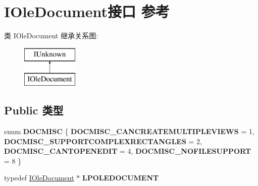 \hypertarget{interface_i_ole_document}{}\section{I\+Ole\+Document接口 参考}
\label{interface_i_ole_document}
类 I\+Ole\+Document 继承关系图\+:\begin{figure}[H]
\begin{center}
\leavevmode
\includegraphics[height=2.000000cm]{interface_i_ole_document}
\end{center}
\end{figure}
\subsection*{Public 类型}
\begin{DoxyCompactItemize}
\item 
\mbox{\label{interface_i_ole_document_af963ec76ceebdfe700a5f3efd6d51e92}} 
enum {\bfseries D\+O\+C\+M\+I\+SC} \{ {\bfseries D\+O\+C\+M\+I\+S\+C\+\_\+\+C\+A\+N\+C\+R\+E\+A\+T\+E\+M\+U\+L\+T\+I\+P\+L\+E\+V\+I\+E\+WS} = 1, 
{\bfseries D\+O\+C\+M\+I\+S\+C\+\_\+\+S\+U\+P\+P\+O\+R\+T\+C\+O\+M\+P\+L\+E\+X\+R\+E\+C\+T\+A\+N\+G\+L\+ES} = 2, 
{\bfseries D\+O\+C\+M\+I\+S\+C\+\_\+\+C\+A\+N\+T\+O\+P\+E\+N\+E\+D\+IT} = 4, 
{\bfseries D\+O\+C\+M\+I\+S\+C\+\_\+\+N\+O\+F\+I\+L\+E\+S\+U\+P\+P\+O\+RT} = 8
 \}
\item 
\mbox{\label{interface_i_ole_document_ab991a9d9e320647ae4f978f53d95dd0d}} 
typedef \hyperlink{interface_i_ole_document}{I\+Ole\+Document} $\ast$ {\bfseries L\+P\+O\+L\+E\+D\+O\+C\+U\+M\+E\+NT}
\end{DoxyCompactItemize}
